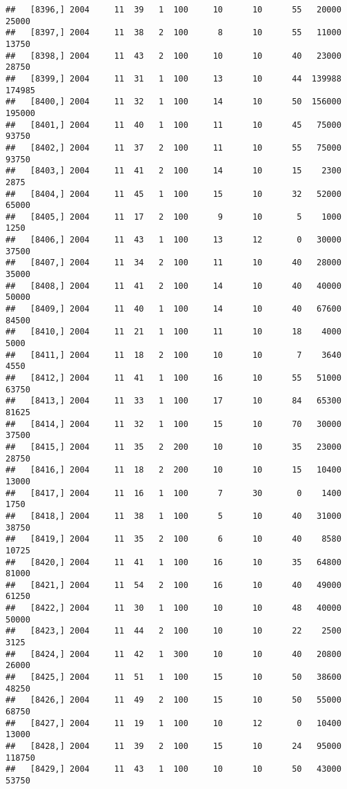 \documentclass{article}\usepackage[]{graphicx}\usepackage[]{color}
\makeatletter
\newenvironment{kframe}{%
 \def\at@end@of@kframe{}%
 \ifinner\ifhmode%
  \def\at@end@of@kframe{\end{minipage}}%
  \begin{minipage}{\columnwidth}%
 \fi\fi%
 \def\FrameCommand##1{\hskip\@totalleftmargin \hskip-\fboxsep
 \colorbox{shadecolor}{##1}\hskip-\fboxsep
     \hskip-\linewidth \hskip-\@totalleftmargin \hskip\columnwidth}%
 \MakeFramed {\advance\hsize-\width
   \@totalleftmargin\z@ \linewidth\hsize
   \@setminipage}}%
 {\par\unskip\endMakeFramed%
 \at@end@of@kframe}
\newenvironment{knitrout}{}{} %
\makeatother
\begin{document}
\begin{knitrout}
\begin{kframe}
\begin{verbatim}
##   [8396,] 2004     11  39   1  100     10      10      55   20000   25000
##   [8397,] 2004     11  38   2  100      8      10      55   11000   13750
##   [8398,] 2004     11  43   2  100     10      10      40   23000   28750
##   [8399,] 2004     11  31   1  100     13      10      44  139988  174985
##   [8400,] 2004     11  32   1  100     14      10      50  156000  195000
##   [8401,] 2004     11  40   1  100     11      10      45   75000   93750
##   [8402,] 2004     11  37   2  100     11      10      55   75000   93750
##   [8403,] 2004     11  41   2  100     14      10      15    2300    2875
##   [8404,] 2004     11  45   1  100     15      10      32   52000   65000
##   [8405,] 2004     11  17   2  100      9      10       5    1000    1250
##   [8406,] 2004     11  43   1  100     13      12       0   30000   37500
##   [8407,] 2004     11  34   2  100     11      10      40   28000   35000
##   [8408,] 2004     11  41   2  100     14      10      40   40000   50000
##   [8409,] 2004     11  40   1  100     14      10      40   67600   84500
##   [8410,] 2004     11  21   1  100     11      10      18    4000    5000
##   [8411,] 2004     11  18   2  100     10      10       7    3640    4550
##   [8412,] 2004     11  41   1  100     16      10      55   51000   63750
##   [8413,] 2004     11  33   1  100     17      10      84   65300   81625
##   [8414,] 2004     11  32   1  100     15      10      70   30000   37500
##   [8415,] 2004     11  35   2  200     10      10      35   23000   28750
##   [8416,] 2004     11  18   2  200     10      10      15   10400   13000
##   [8417,] 2004     11  16   1  100      7      30       0    1400    1750
##   [8418,] 2004     11  38   1  100      5      10      40   31000   38750
##   [8419,] 2004     11  35   2  100      6      10      40    8580   10725
##   [8420,] 2004     11  41   1  100     16      10      35   64800   81000
##   [8421,] 2004     11  54   2  100     16      10      40   49000   61250
##   [8422,] 2004     11  30   1  100     10      10      48   40000   50000
##   [8423,] 2004     11  44   2  100     10      10      22    2500    3125
##   [8424,] 2004     11  42   1  300     10      10      40   20800   26000
##   [8425,] 2004     11  51   1  100     15      10      50   38600   48250
##   [8426,] 2004     11  49   2  100     15      10      50   55000   68750
##   [8427,] 2004     11  19   1  100     10      12       0   10400   13000
##   [8428,] 2004     11  39   2  100     15      10      24   95000  118750
##   [8429,] 2004     11  43   1  100     10      10      50   43000   53750

\end{verbatim}
\end{kframe}
\end{knitrout}
\end{document}

